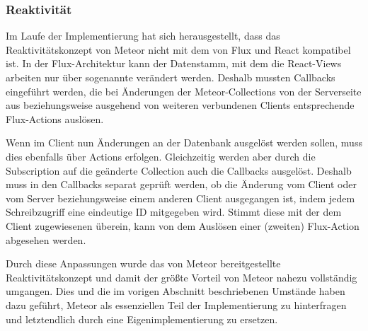 \subsubsection{Reaktivität}
\label{sssec:elf_reaktivität}

Im Laufe der Implementierung hat sich herausgestellt, dass das
Reaktivitätskonzept von Meteor nicht mit dem von Flux und React kompatibel ist.
In der Flux-Architektur kann der Datenstamm, mit dem die React-Views arbeiten
nur über sogenannte  verändert werden.  Deshalb mussten
Callbacks eingeführt werden, die bei Änderungen der Meteor-Collections von der
Serverseite aus beziehungsweise ausgehend von weiteren verbundenen Clients
entsprechende Flux-Actions auslösen.

Wenn im Client nun Änderungen an der Datenbank ausgelöst werden sollen, muss
dies ebenfalls über Actions erfolgen.  Gleichzeitig werden aber durch die
Subscription auf die geänderte Collection auch die Callbacks ausgelöst.  Deshalb
muss in den Callbacks separat geprüft werden, ob die Änderung vom Client oder
vom Server beziehungsweise einem anderen Client ausgegangen ist, indem jedem
Schreibzugriff eine eindeutige ID mitgegeben wird.  Stimmt diese mit der dem
Client zugewiesenen überein, kann von dem Auslösen einer (zweiten) Flux-Action
abgesehen werden.

Durch diese Anpassungen wurde das von Meteor bereitgestellte Reaktivitätskonzept
und damit der größte Vorteil von Meteor nahezu vollständig umgangen.  Dies und
die im vorigen Abschnitt beschriebenen Umstände haben dazu geführt, Meteor als
essenziellen Teil der Implementierung zu hinterfragen und letztendlich
durch eine Eigenimplementierung zu ersetzen.
